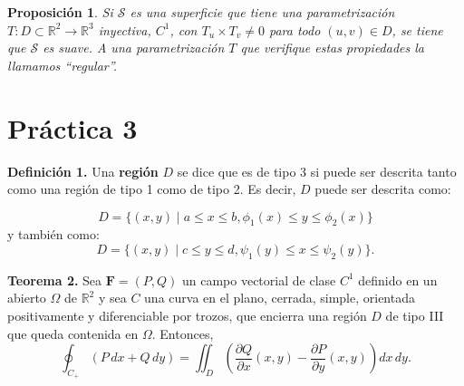 \documentclass[11pt,a4paper,pdftex]{amsart}
\newtheorem{prop}{Proposición}[section]
\newcommand{\R}{\mathbb R}
\newcommand{\0}{\mathbb O}
\newcommand{\Su}{\mathcal{S}}
\newcommand{\8}{\infty}
\begin{document}
\begin{prop} \label{suave} Si $\Su$ es una superficie que tiene una parametrización $T:D\subset\R^2\to\R^3$ inyectiva,
  $C^1$, con $T_u\times T_v\neq0$ para todo $(u,v)\in D$, se tiene que $\Su$ es suave. A una parametrización $T$ que verifique estas propiedades la llamamos ``regular''.
\end{prop}




\section{Práctica 3}


\noindent\textbf{Definici\'on 1.} Una \textbf{región} \( D \) se dice que es de tipo 3 si puede ser descrita tanto como una región de tipo 1 como de tipo 2. Es decir, \( D \) puede ser descrita como:

\[
D = \{(x, y) \mid a \leq x \leq b, \phi_1(x) \leq y \leq \phi_2(x)\}
\]
y también como:
\[
D = \{(x, y) \mid c \leq y \leq d, \psi_1(y) \leq x \leq \psi_2(y)\}.
\]
\bigskip 

\noindent\textbf{Teorema 2.}
Sea $\mathbf{F} = (P,Q)$ un campo vectorial de clase $C^1$ definido en un abierto $\Omega$ de $\mathbb{R}^2$ y sea $C$ una curva en el plano, cerrada, simple, orientada positivamente y diferenciable por trozos, que encierra una región $D$ de tipo III que queda contenida en $\Omega$. Entonces,
\begin{equation}
    \oint_{C_+} (P \,dx + Q \,dy) = \iint_D \left( \frac{\partial Q}{\partial x}(x,y) - \frac{\partial P}{\partial y}(x,y) \right) dx \, dy.
\end{equation}
\end{document}
